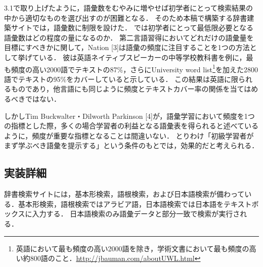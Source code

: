 \documentclass[technicalreport]{ieicej}
\begin{document}
3.1で取り上げたように，語彙数をむやみに増やせば初学者にとって検索結果の中から適切なものを選び出すのが困難となる．
そのため本稿で構築する辞書建築サイトでは，語彙数に制限を設けた．
では初学者にとって最低限必要となる語彙数はどの程度の量になるのか．
第二言語習得においてどれだけの語彙量を目標にすべきかに関して，Nation [3]は語彙の頻度に注目することを1つの方法として挙げている．
彼は英語ネイティブスピーカーの中等学校教科書を例に，最も頻度の高い2000語でテキストの87\%，さらにUniversity word list\footnote{英語において最も頻度の高い2000語を除き，学術文書において最も頻度の高い約800語のこと．\url{http://jbauman.com/aboutUWL.html}}を加えた2800語でテキストの95\%をカバーしていると示している．
この結果は英語に限られるものであり，他言語にも同じように頻度とテキストカバー率の関係を当てはめるべきではない．

しかしTim Buckwalter・Dilworth Parkinson [4]が，語彙学習において頻度を1つの指標とした際，多くの場合学習者の利益となる語彙表を得られると述べているように，頻度が重要な指標となることは間違いない．
とりわけ「初級学習者がまず学ぶべき語彙を提示する」という条件のもとでは，効果的だと考えられる．

\subsection{実装詳細}
辞書検索サイトには，基本形検索，語根検索，および日本語検索が備わっている．基本形検索，語根検索ではアラビア語，日本語検索では日本語をテキストボックスに入力する．
日本語検索のみ語彙データと部分一致で検索が実行される．
\end{document}
